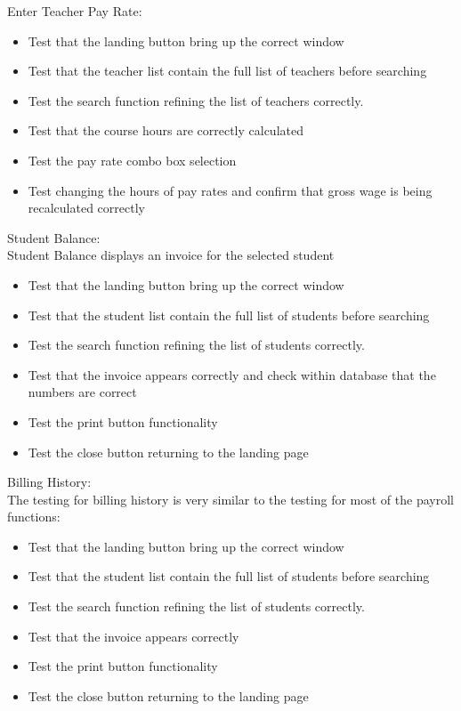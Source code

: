Enter Teacher Pay Rate:\\

\begin{itemize}
\item Test that the landing button bring up the correct window
\item Test that the teacher list contain the full list of teachers before searching
\item Test the search function refining the list of teachers correctly.
\item Test that the course hours are correctly calculated
\item Test the pay rate combo box selection
\item Test changing the hours of pay rates and confirm that gross wage is being recalculated correctly
\end{itemize} 


Student Balance:\\
Student Balance displays an invoice for the selected student

\begin{itemize}
\item Test that the landing button bring up the correct window
\item Test that the student list contain the full list of students before searching
\item Test the search function refining the list of students correctly.
\item Test that the invoice appears correctly and check within database that the numbers are correct
\item Test the print button functionality
\item Test the close button returning to the landing page
\end{itemize} 

Billing History:\\
The testing for billing history is very similar to the testing for most of the payroll functions:

\begin{itemize}
\item Test that the landing button bring up the correct window
\item Test that the student list contain the full list of students before searching
\item Test the search function refining the list of students correctly.
\item Test that the invoice appears correctly
\item Test the print button functionality
\item Test the close button returning to the landing page
\end{itemize}


